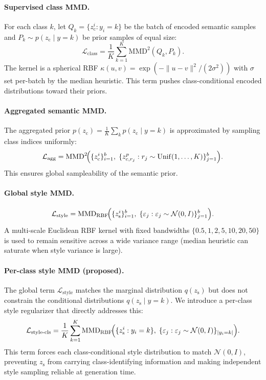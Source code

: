 \documentclass[10pt]{article}
\newcommand{\zc}{z_{\mathrm{c}}}
\newcommand{\zs}{z_{\mathrm{s}}}
\newcommand{\MMD}{\mathrm{MMD}}
\begin{document}
\paragraph{Supervised class MMD.}
For each class $k$, let $Q_k=\{\zc^i:y_i=k\}$ be the batch of encoded semantic
samples and $P_k\sim p(\zc\mid y{=}k)$ be prior samples of equal size:
\begin{equation}
  \mathcal{L}_{\mathrm{class}}
  = \frac{1}{K}\sum_{k=1}^{K}\MMD^2(Q_k,P_k).
  \label{eq:class-mmd}
\end{equation}
The kernel is a spherical RBF $\kappa(u,v)=\exp(-\|u-v\|^2/(2\sigma^2))$
with $\sigma$ set per-batch by the median heuristic.
This term pushes class-conditional encoded distributions toward their priors.

\paragraph{Aggregated semantic MMD.}
The aggregated prior $p(\zc)=\tfrac{1}{K}\sum_k p(\zc\mid y{=}k)$ is approximated
by sampling class indices uniformly:
\begin{equation}
  \mathcal{L}_{\mathrm{agg}}
  = \MMD^2\!\Bigl(\{\zc^i\}_{i=1}^{b},\;
    \{z_{c,r_j}^p : r_j\sim\mathrm{Unif}(1,\dots,K)\}_{j=1}^{b}\Bigr).
  \label{eq:agg-mmd}
\end{equation}
This ensures global sampleability of the semantic prior.

\paragraph{Global style MMD.}
\begin{equation}
  \mathcal{L}_{\mathrm{style}}
  = \MMD_{\mathrm{RBF}}\!\Bigl(\{\zs^i\}_{i=1}^{b},\;
    \{\varepsilon_j:\varepsilon_j\sim\mathcal{N}(0,I)\}_{j=1}^{b}\Bigr).
  \label{eq:style-mmd}
\end{equation}
A multi-scale Euclidean RBF kernel with fixed bandwidths
$\{0.5, 1, 2, 5, 10, 20, 50\}$ is used to remain sensitive across a wide variance
range (median heuristic can saturate when style variance is large).

\paragraph{Per-class style MMD (proposed).}
The global term $\mathcal{L}_{\mathrm{style}}$ matches the marginal distribution
$q(\zs)$ but does not constrain the conditional distributions $q(\zs\mid y{=}k)$.
We introduce a per-class style regularizer that directly addresses this:
\begin{equation}
  \mathcal{L}_{\mathrm{style\text{-}cls}}
  = \frac{1}{K}\sum_{k=1}^{K}
    \MMD_{\mathrm{RBF}}\!\Bigl(
      \{\zs^i:y_i=k\},\;
      \{\varepsilon_j:\varepsilon_j\sim\mathcal{N}(0,I)\}_{|y_i=k|}
    \Bigr).
  \label{eq:style-cls-mmd}
\end{equation}
This term forces each class-conditional style distribution to match $\mathcal{N}(0,I)$,
preventing $\zs$ from carrying class-identifying information and making
independent style sampling reliable at generation time.
\end{document}
